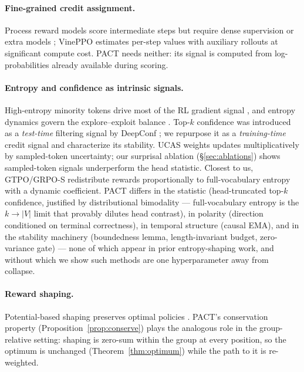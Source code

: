 \documentclass{article} %
\theoremstyle{plain}
\theoremstyle{definition}
\theoremstyle{remark}
\newcommand{\method}{PACT}
\begin{document}
\paragraph{Fine-grained credit assignment.} Process reward models score intermediate steps but require dense supervision or extra models \citep{lightman2023let,uesato2022solving}; VinePPO \citep{kazemnejad2024vineppo} estimates per-step values with auxiliary rollouts at significant compute cost. \method{} needs neither: its signal is computed from log-probabilities already available during scoring.

\paragraph{Entropy and confidence as intrinsic signals.} High-entropy minority tokens drive most of the RL gradient signal \citep{wang2025beyond}, and entropy dynamics govern the explore--exploit balance \citep{cui2025entropy,haarnoja2018soft}. Top-$k$ confidence was introduced as a \emph{test-time} filtering signal by DeepConf \citep{fu2025deepconf}; we repurpose it as a \emph{training-time} credit signal and characterize its stability. UCAS \citep{ucas2025} weights updates multiplicatively by sampled-token uncertainty; our surprisal ablation (\S\ref{sec:ablations}) shows sampled-token signals underperform the head statistic. Closest to us, GTPO/GRPO-S \citep{tan2025gtpo} redistribute rewards proportionally to full-vocabulary entropy with a dynamic coefficient. \method{} differs in the statistic (head-truncated top-$k$ confidence, justified by distributional bimodality --- full-vocabulary entropy is the $k\to|V|$ limit that provably dilutes head contrast), in polarity (direction conditioned on terminal correctness), in temporal structure (causal EMA), and in the stability machinery (boundedness lemma, length-invariant budget, zero-variance gate) --- none of which appear in prior entropy-shaping work, and without which we show such methods are one hyperparameter away from collapse.

\paragraph{Reward shaping.} Potential-based shaping preserves optimal policies \citep{ng1999policy}. \method{}'s conservation property (Proposition~\ref{prop:conserve}) plays the analogous role in the group-relative setting: shaping is zero-sum within the group at every position, so the optimum is unchanged (Theorem~\ref{thm:optimum}) while the path to it is re-weighted.
\end{document}
